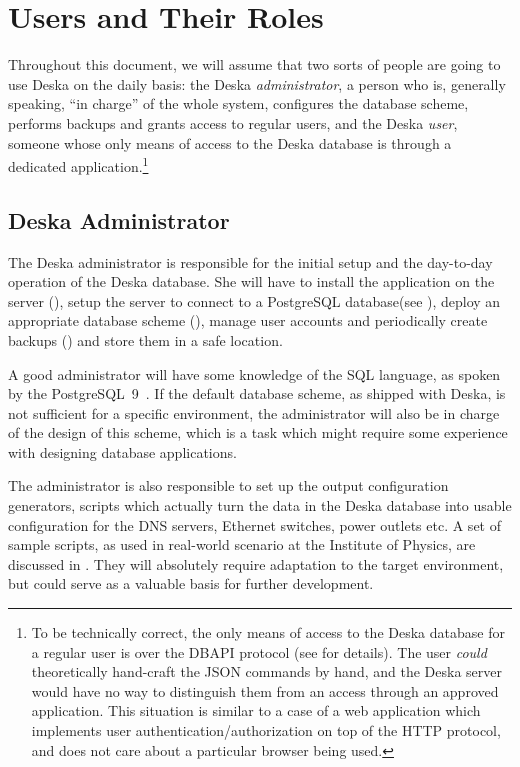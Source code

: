 \documentclass[deska]{subfiles}
\begin{document}
\section{Users and Their Roles}

Throughout this document, we will assume that two sorts of people are going to use Deska on the daily basis: the Deska
{\em administrator}, a person who is, generally speaking, ``in charge'' of the whole system, configures the database
scheme, performs backups and grants access to regular users, and the Deska {\em user}, someone whose only means of
access to the Deska database is through a dedicated application.\footnote{To be technically correct, the only means of
access to the Deska database for a regular user is over the DBAPI protocol (see  for
details).  The user {\em could} theoretically hand-craft the JSON commands by hand, and the Deska server would have no
way to distinguish them from an access through an approved application.  This situation is similar to a case of a web
application which implements user authentication/authorization on top of the HTTP protocol, and does not care about a
particular browser being used.}

\subsection{Deska Administrator}

The Deska administrator is responsible for the initial setup and the day-to-day operation of the Deska database.  She
will have to install the application on the server (), setup the server to connect to a PostgreSQL
database(see ), deploy an appropriate database scheme (),
manage user accounts and periodically create backups () and store them in a safe location.

A good administrator will have some knowledge of the SQL language, as spoken by the PostgreSQL~9~\cite{postgresql}.  If
the default database scheme, as shipped with Deska, is not sufficient for a specific environment, the administrator will
also be in charge of the design of this scheme, which is a task which might require some experience with designing
database applications.

The administrator is also responsible to set up the output configuration generators, scripts which actually turn the
data in the Deska database into usable configuration for the DNS servers, Ethernet switches, power outlets etc.  A set
of sample scripts, as used in real-world scenario at the Institute of Physics, are discussed in .
They will absolutely require adaptation to the target environment, but could serve as a valuable basis for further
development.
\end{document}
